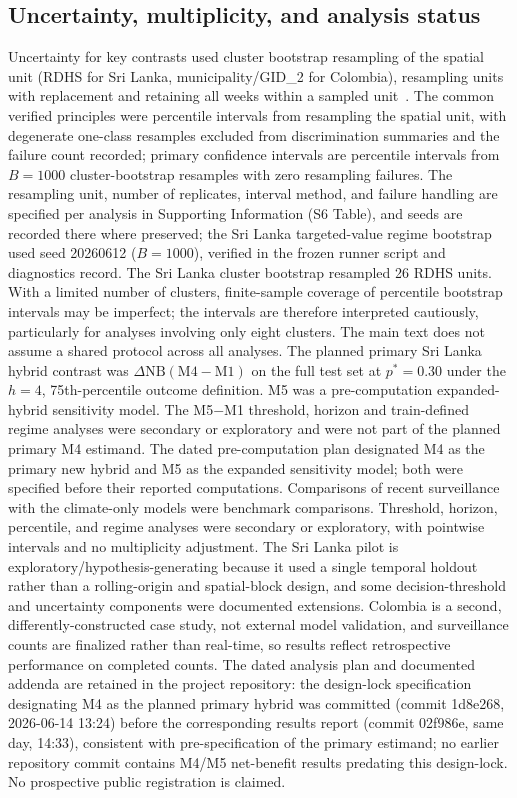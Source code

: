 \documentclass[11pt,a4paper]{article}
\begin{document}
\subsection{Uncertainty, multiplicity, and analysis status}
Uncertainty for key contrasts used cluster bootstrap resampling of the spatial unit (RDHS for Sri Lanka, municipality/GID\_2 for Colombia), resampling units with replacement and retaining all weeks within a sampled unit~\cite{CameronGelbachMiller2008}. The common verified principles were percentile intervals from resampling the spatial unit, with degenerate one-class resamples excluded from discrimination summaries and the failure count recorded; primary confidence intervals are percentile intervals from $B=1000$ cluster-bootstrap resamples with zero resampling failures. The resampling unit, number of replicates, interval method, and failure handling are specified per analysis in Supporting Information (S6 Table), and seeds are recorded there where preserved; the Sri Lanka targeted-value regime bootstrap used seed 20260612 ($B=1000$), verified in the frozen runner script and diagnostics record. The Sri Lanka cluster bootstrap resampled 26 RDHS units. With a limited number of clusters, finite-sample coverage of percentile bootstrap intervals may be imperfect; the intervals are therefore interpreted cautiously, particularly for analyses involving only eight clusters. The main text does not assume a shared protocol across all analyses. The planned primary Sri Lanka hybrid contrast was $\Delta\mathrm{NB}(\text{M4}-\text{M1})$ on the full test set at $p^*=0.30$ under the $h=4$, 75th-percentile outcome definition. M5 was a pre-computation expanded-hybrid sensitivity model. The M5$-$M1 threshold, horizon and train-defined regime analyses were secondary or exploratory and were not part of the planned primary M4 estimand. The dated pre-computation plan designated M4 as the primary new hybrid and M5 as the expanded sensitivity model; both were specified before their reported computations. Comparisons of recent surveillance with the climate-only models were benchmark comparisons. Threshold, horizon, percentile, and regime analyses were secondary or exploratory, with pointwise intervals and no multiplicity adjustment. The Sri Lanka pilot is exploratory/hypothesis-generating because it used a single temporal holdout rather than a rolling-origin and spatial-block design, and some decision-threshold and uncertainty components were documented extensions. Colombia is a second, differently-constructed case study, not external model validation, and surveillance counts are finalized rather than real-time, so results reflect retrospective performance on completed counts. The dated analysis plan and documented addenda are retained in the project repository: the design-lock specification designating M4 as the planned primary hybrid was committed (commit 1d8e268, 2026-06-14 13:24) before the corresponding results report (commit 02f986e, same day, 14:33), consistent with pre-specification of the primary estimand; no earlier repository commit contains M4/M5 net-benefit results predating this design-lock. No prospective public registration is claimed.
\end{document}
